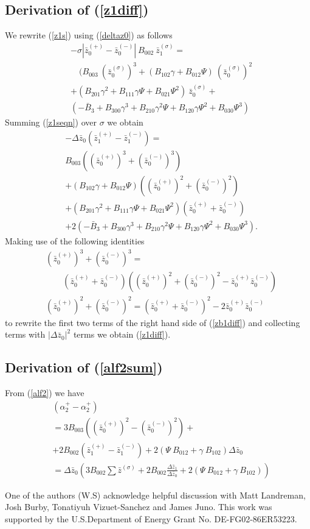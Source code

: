 \documentclass[aip,pop,reprint]{revtex4-1}
\newcommand*{\zb}{\bar{z}}
\newcommand*{\zbs}{\zb^{(\sigma)}}
\newcommand*{\zbp}{\zb^{(+)}}
\newcommand*{\zbm}{\zb^{(-)}}
\newcommand*{\Bb}{\bar{B}}
\newcommand*{\lbr}{\left(}
\newcommand*{\rbr}{\right)}
\begin{document}
\begin{appendices}
\subsection*{Derivation of (\ref{z1diff}) }
We rewrite (\ref{z1s}) using (\ref{deltaz0}) as follows
\begin{align}
&-\sigma |\zbp_0-\zbm_0|\:B_{002}\:\zbs_1 =\nonumber\\
&\quad (B_{003}\:(\zbs_0)^3 +(B_{102}\gamma +B_{012}\Psi)\: (\zbs_0)^2 \label{z1seqn}
\\
&+(B_{201}\gamma^2+ B_{111}\gamma\Psi+B_{021}\Psi^2)\: \zbs_0+ \nonumber\\
&(-\Bb_3+B_{300}\gamma^3+B_{210} \gamma^2 \Psi+ B_{120}\gamma \Psi^2+B_{030}\Psi^3)\nonumber
\end{align}
Summing (\ref{z1seqn}) over $\sigma$ we obtain
\begin{align}
   &-\Delta \zb_0 (\zbp_1-\zbm_1)=\nonumber \\ & B_{003}\left((\zbp_0)^3 + (\zbm_0)^3\right) \nonumber\\
   &+(B_{102}\gamma +B_{012}\Psi)\left((\zbp_0)^2+ (\zbm_0)^2\right) \label{zb1diff}\\ 
   &+(B_{201}\gamma^2+B_{111}\gamma \Psi +B_{021}\Psi^2) \left(\zbp_0+\zbm_0\right)\nonumber \\
   &+2(-\Bb_3+B_{300}\gamma^3+B_{210}\gamma^2 \Psi +B_{120}\gamma \Psi^2+B_{030}\Psi^3).\nonumber
\end{align}
Making use of the following identities
\begin{align*}
   &(\zbp_0)^3+(\zbm_0)^3=\\
   &\quad \quad (\zbp_0+\zbm_0)\left((\zbp_0)^2+(\zbm_0)^2-\zbp_0\zbm_0 \right)\\ 
   &(\zbp_0)^2+(\zbm_0)^2=(\zbp_0+\zbm_0)^2-2 \zbp_0\zbm_0
\end{align*}
to rewrite the first two terms of the right hand side of (\ref{zb1diff}) and collecting terms with $|\Delta \zb_0|^2$ terms we obtain (\ref{z1diff}).
\subsection*{Derivation of (\ref{alf2sum})}
From (\ref{alf2}) we have 
\begin{align}
    &(\alpha^{+}_2-\alpha^{+}_2)\nonumber \\
    &=3 B_{003}\lbr (\zbp_0)^2 -(\zbm_0)^2\rbr+ \\
    &+2B_{002}(\zbp_1-\zbm_1)+2(\Psi\: B_{012}+\gamma\: B_{102})\Delta\zb_0 \nonumber\\
    &=\Delta\zb_0 \lbr 3B_{002}\sum \zbs+2B_{002}\frac{\Delta \zb_1}{\Delta \zb_0} +2(\Psi\: B_{012}+\gamma\: B_{102}) \rbr \nonumber
\end{align}
\end{appendices}
 \begin{acknowledgments}
One of the authors (W.S) acknowledge helpful discussion with Matt Landreman, Josh Burby, Tonatiyuh Vizuet-Sanchez and James Juno. 
This work was supported by the U.S.Department of Energy Grant No. DE-FG02-86ER53223.
\end{acknowledgments}

%

 

\end{document}
